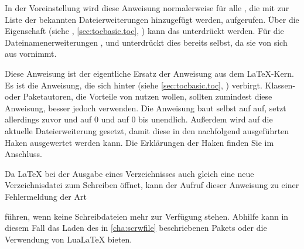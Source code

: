 In der Voreinstellung wird diese Anweisung normalerweise für alle
, die mit  zur
Liste der bekannten Dateierweiterungen hinzugefügt werden, aufgerufen. Über
die Eigenschaft  (siehe
, \autoref{sec:tocbasic.toc},
) kann das unterdrückt werden. Für die
Dateinamenerweiterungen ,  und  unterdrückt
 dies bereits selbst, %
\iftrue%
da  sie von sich aus vornimmt.%
\else%
damit die Umschaltung nicht mehrfach in die zugehörigen Dateien
eingetragen wird.%
\fi
\iffalse%
Normalerweise gibt es keinen Grund, diese Anweisung selbst aufzurufen. Es sind
allerdings Verzeichnisse denkbar, die nicht unter der Kontrolle von
\Package{tocbasic} stehen, also nicht in der Liste der bekannten
Dateierweiterungen geführt werden, aber trotzdem die Spracherweiterung für
\Package{babel} nutzen sollen. Für derartige Verzeichnisse wäre die Anweisung
explizit aufzurufen. Bitte\textnote{Achtung!} achten Sie jedoch darauf, dass
dies für jede Dateierweiterung nur einmal geschieht!%
\fi
\EndIndexGroup


\begin{Declaration}
\end{Declaration}
Diese Anweisung ist der eigentliche Ersatz der Anweisung
 aus dem
\LaTeX-Kern. Es ist die Anweisung, die sich hinter
 (siehe \autoref{sec:tocbasic.toc},
) verbirgt. Klassen- oder Paketautoren,
die Vorteile von  nutzen wollen, sollten zumindest diese
Anweisung, besser jedoch  verwenden. Die
Anweisung baut selbst auf  auf, setzt allerdings zuvor
 und
 auf 0 und
 auf 0 bis unendlich. Außerdem
wird  auf die
aktuelle Dateierweiterung gesetzt, damit diese in den nachfolgend ausgeführten
Haken ausgewertet werden kann. Die Erklärungen der Haken finden
Sie im Anschluss.

Da \LaTeX{} bei der Ausgabe eines Verzeichnisses auch
gleich eine neue Verzeichnisdatei zum Schreiben öffnet, kann der Aufruf dieser
Anweisung zu einer Fehlermeldung der Art
führen, wenn keine Schreibdateien mehr zur Verfügung stehen. Abhilfe kann in
diesem Fall das Laden des in \autoref{cha:scrwfile} beschriebenen Pakets
oder die Verwendung von Lua\LaTeX{} bieten.%
\EndIndexGroup


